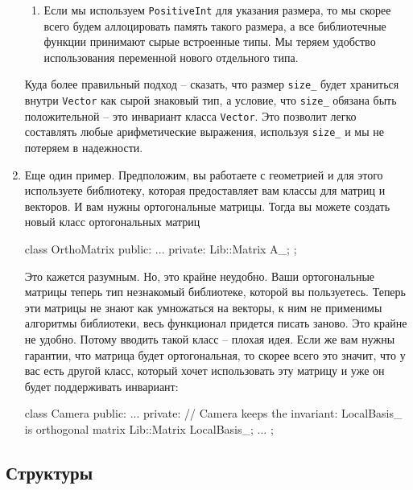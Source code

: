 \begin{enumerate}
\begin{enumerate}
\item Если мы используем \verb"PositiveInt" для указания размера, то мы скорее всего будем аллоцировать память такого размера, а все библиотечные функции принимают сырые встроенные типы.
Мы теряем удобство использования переменной нового отдельного типа.
\end{enumerate}
Куда более правильный подход -- сказать, что размер \verb"size_" будет храниться внутри \verb"Vector" как сырой знаковый тип, а условие, что \verb"size_" обязана быть положительной -- это инвариант класса \verb"Vector".
Это позволит легко составлять любые арифметические выражения, используя \verb"size_" и мы не потеряем в надежности.

\item Еще один пример.
Предположим, вы работаете с геометрией и для этого используете библиотеку, которая предоставляет вам классы для матриц и векторов.
И вам нужны ортогональные матрицы.
Тогда вы можете создать новый класс ортогональных матриц
\begin{cppcode}
class OrthoMatrix {
public:
  ...
private:
  Lib::Matrix A_;
};
\end{cppcode}
Это кажется разумным.
Но, это крайне неудобно.
Ваши ортогональные матрицы теперь тип незнакомый библиотеке, которой вы пользуетесь.
Теперь эти матрицы не знают как умножаться на векторы, к ним не применимы алгоритмы библиотеки, весь функционал придется писать заново.
Это крайне не удобно.
Потому вводить такой класс -- плохая идея.
Если же вам нужны гарантии, что матрица будет ортогональная, то скорее всего это значит, что у вас есть другой класс, который хочет использовать эту матрицу и уже он будет поддерживать инвариант:
\begin{cppcode}
class Camera {
public:
  ...
private:
  // Camera keeps the invariant: LocalBasis_ is orthogonal matrix
  Lib::Matrix LocalBasis_;
  ...
};
\end{cppcode}
\end{enumerate}

\subsection{Структуры}

